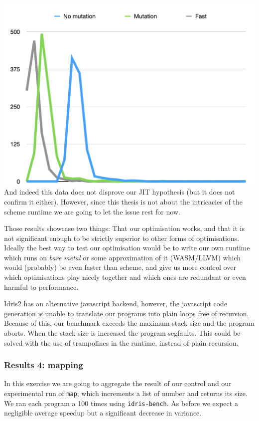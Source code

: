 \documentclass[
]{article}
\begin{document}
\includegraphics{Screenshot 2020-08-25 at 17.59.21.png} And indeed this
data does not disprove our JIT hypothesis (but it does not confirm it
either). However, since this thesis is not about the intricacies of the
scheme runtime we are going to let the issue rest for now.

Those results showcase two things: That our optimisation works, and that
it is not significant enough to be strictly superior to other forms of
optimisations. Ideally the best way to test our optimisation would be to
write our own runtime which runs on \emph{bare metal} or some
approximation of it (WASM/LLVM) which would (probably) be even faster
than scheme, and give us more control over which optimisations play
nicely together and which ones are redundant or even harmful to
performance.

Idris2 has an alternative javascript backend, however, the javascript
code generation is unable to translate our programs into plain loops
free of recursion. Because of this, our benchmark exceeds the maximum
stack size and the program aborts. When the stack size is increased the
program segfaults. This could be solved with the use of trampolines in
the runtime, instead of plain recursion.

\hypertarget{results-4-mapping}{%
\subsubsection{Results 4: mapping}\label{results-4-mapping}}

In this exercise we are going to aggregate the result of our control and
our experimental run of \texttt{map}; which increments a list of number
and returns its size. We ran each program a 100 times using
\texttt{idris-bench}. As before we expect a negligible average speedup
but a significant decrease in variance.
\end{document}

